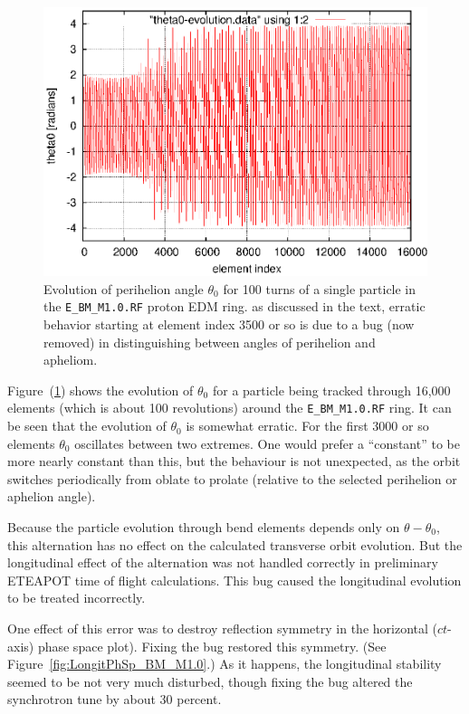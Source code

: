 \documentclass[]{article}
\begin{document}
%
\begin{figure}[h]
\centering
\includegraphics[scale=0.8]{eps/theta0-evolution.eps}
\caption{\label{fig:theta0-evolution}Evolution of perihelion angle $\theta_0$
for 100 turns of a single particle in the {\tt E\_BM\_M1.0.RF} proton EDM ring.
as discussed in the text, erratic behavior starting at element index 3500 or so 
is due to a bug (now removed) in distinguishing between angles of perihelion 
and apheliom.}
\end{figure}
%
Figure~(\ref{fig:theta0-evolution}) shows the evolution
of $\theta_0$ for a particle being tracked through 16,000 elements
(which is about 100 revolutions) around the {\tt E\_BM\_M1.0.RF} ring. 
It can be seen that the evolution of $\theta_0$ is somewhat erratic.
For the first 3000 or so elements $\theta_0$ oscillates between two
extremes. One would prefer a ``constant'' to be more nearly constant than this,
but the behaviour is not unexpected, as the orbit switches periodically from
oblate to prolate (relative to the selected perihelion or aphelion angle).

Because the particle evolution through bend elements depends only
on $\theta-\theta_0$, this alternation has no effect on the calculated
transverse orbit evolution. But the longitudinal effect of the alternation 
was not handled correctly in preliminary ETEAPOT time of flight calculations. 
This bug caused the longitudinal evolution to be treated incorrectly. 

One effect of this error was to destroy reflection symmetry in the horizontal
($ct$-axis) phase space plot). Fixing the bug restored this symmetry. 
(See Figure~\ref{fig:LongitPhSp_BM_M1.0}.) As it happens, the longitudinal 
stability seemed to be not very much disturbed, though fixing the bug altered 
the synchrotron tune by about 30 percent.
\end{document}
